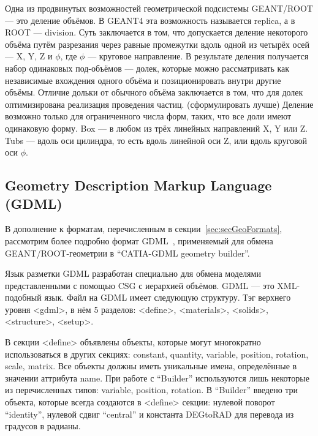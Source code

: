 Одна из продвинутых возможностей геометрической подсистемы GEANT/ROOT --- это деление объёмов. В GEANT4 эта возможность называется replica, а в ROOT --- division. Суть заключается в том, что допускается деление некоторого объёма путём разрезания через равные промежутки вдоль одной из четырёх осей --- X, Y, Z и $\phi$, где $\phi$ --- круговое направление. В результате деления получается набор одинаковых под-объёмов --- долек, которые можно рассматривать как независимые вхождения одного объёма и позиционировать внутри другие объёмы. Отличие дольки от обычного объёма заключается в том, что для долек оптимизирована реализация проведения частиц. (\todo сформулировать лучше) Деление возможно только для ограниченного числа форм, таких, что все доли имеют одинаковую форму. Box --- в любом из трёх линейных направлений X, Y или Z. Tubs --- вдоль оси цилиндра, то есть вдоль линейной оси Z, или вдоль круговой оси $\phi$.

%                           

\subsection{Geometry Description Markup Language (GDML)}\label{sec:secGDML}

В дополнение к форматам, перечисленным в секции~\ref{sec:secGeoFormats}, рассмотрим более подробно формат GDML~\cite{GDML}, применяемый для обмена GEANT/ROOT-геометрии в ``CATIA-GDML geometry builder''.

Язык разметки GDML разработан специально для обмена моделями представленными с помощью CSG с иерархией объёмов. GDML --- это XML-подобный язык. Файл на GDML имеет следующую структуру. Тэг верхнего уровня <gdml>, в нём 5 разделов:
<define>,
<materials>,
<solids>,
<structure>,
<setup>.

В секции <define> объявлены объекты, которые могут многократно использоваться в других секциях:
constant,
quantity,
variable,
position,
rotation,
scale,
matrix.
Все объекты должны иметь уникальные имена, определённые в значении аттрибута name. При работе с ``Builder'' используются лишь некоторые из перечисленных типов: variable, position, rotation. В ``Builder'' введено три объекта, которые всегда создаются в <define> секции: нулевой поворот ``identity'', нулевой сдвиг ``central'' и константа DEGtoRAD для перевода из градусов в радианы.

